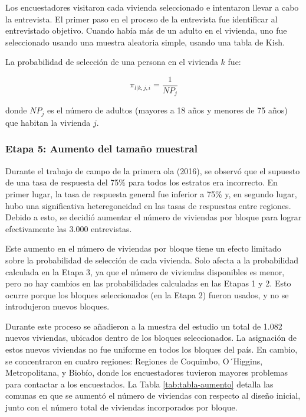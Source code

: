 \documentclass[
  12pt,
]{article}
\begin{document}
Los encuestadores visitaron cada vivienda seleccionado e intentaron llevar a cabo la entrevista. El primer paso en el proceso de la entrevista fue identificar al entrevistado objetivo. Cuando había más de un adulto en el vivienda, uno fue seleccionado usando una muestra aleatoria simple, usando una tabla de Kish.

La probabilidad de selección de una persona en el vivienda \(k\) fue:

\[\pi_{l|k,j,i}=\frac{1}{NP_j}\]

donde \(NP_j\) es el número de adultos (mayores a 18 años y menores de 75 años) que habitan la vivienda \(j\).

\hypertarget{etapa5m1}{%
\subsubsection*{Etapa 5: Aumento del tamaño muestral}\label{etapa5m1}}

Durante el trabajo de campo de la primera ola (2016), se observó que el supuesto de una tasa de respuesta del 75\% para todos los estratos era incorrecto. En primer lugar, la tasa de respuesta general fue inferior a 75\% y, en segundo lugar, hubo una significativa heteregoneidad en las tasas de respuestas entre regiones. Debido a esto, se decidió aumentar el número de viviendas por bloque para lograr efectivamente las 3.000 entrevistas.

Este aumento en el número de viviendas por bloque tiene un efecto limitado sobre la probabilidad de selección de cada vivienda. Solo afecta a la probabilidad calculada en la Etapa 3, ya que el número de viviendas disponibles es menor, pero no hay cambios en las probabilidades calculadas en las Etapas 1 y 2. Esto ocurre porque los bloques seleccionados (en la Etapa 2) fueron usados, y no se introdujeron nuevos bloques.

Durante este proceso se añadieron a la muestra del estudio un total de 1.082 nuevos viviendas, ubicados dentro de los bloques seleccionados. La asignación de estos nuevos viviendas no fue uniforme en todos los bloques del país. En cambio, se concentraron en cuatro regiones: Regiones de Coquimbo, O´Higgins, Metropolitana, y Biobío, donde los encuestadores tuvieron mayores problemas para contactar a los encuestados. La Tabla \ref{tab:tabla-aumento} detalla las comunas en que se aumentó el número de viviendas con respecto al diseño inicial, junto con el número total de viviendas incorporados por bloque.
\end{document}
